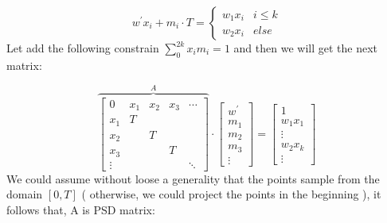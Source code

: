 \documentclass{article}
\begin{document}
\[ 
w^{\prime}x_{i}+m_{i}\cdot T=\begin{cases}
w_{1}x_{i} & i\le k\\
w_{2}x_{i} & else
\end{cases}
\]
Let add the following constrain \( \sum_{0}^{2k}x_{i}m_{i}=1 \) and then we will get the next matrix: 

\[
\overset{A}{\overbrace{\left[\begin{array}{ccccc}
0 & x_{1} & x_{2} & x_{3} & \cdots\\
x_{1} & T\\
x_{2} &  & T\\
x_{3} &  &  & T\\
\vdots &  &  &  & \ddots
\end{array}\right]}}\cdot\left[\begin{array}{c}
w^{\prime}\\
m_{1}\\
m_{2}\\
m_{3}\\
\vdots
\end{array}\right]=\left[\begin{array}{c}
1\\
w_{1}x_{1}\\
\vdots\\
w_{2}x_{k}\\
\vdots
\end{array}\right]
\]
We could assume without loose a generality that the points sample from the domain \( [0,T] \) ( otherwise, we could project the points in the beginning ), it follows that, A is PSD matrix: 
\end{document}
